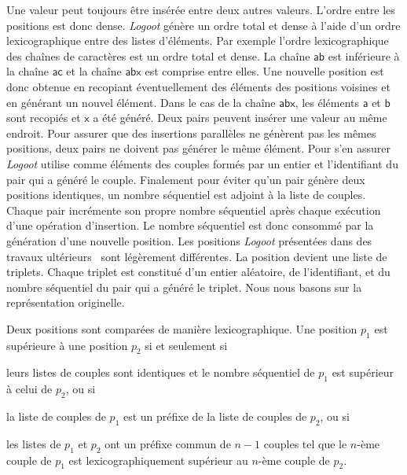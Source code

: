 Une valeur peut toujours être insérée entre deux autres valeurs.
L'ordre entre les positions est donc dense.
\emph{Logoot} génère un ordre total et dense à l'aide d'un ordre lexicographique entre des listes d'éléments.
Par exemple l'ordre lexicographique des chaînes de caractères est un ordre total et dense.
La chaîne $\textsf{ab}$ est inférieure à la chaîne $\textsf{ac}$ et la chaîne $\textsf{abx}$ est comprise entre elles.
Une nouvelle position est donc obtenue en recopiant éventuellement des éléments des positions voisines et en générant un nouvel élément.
Dans le cas de la chaîne $\textsf{abx}$, les éléments $\textsf{a}$ et $\textsf{b}$ sont recopiés et $\textsf{x}$ a été généré.
Deux pairs peuvent insérer une valeur au même endroit.
Pour assurer que des insertions parallèles ne génèrent pas les mêmes positions, deux pairs ne doivent pas générer le même élément.
Pour s'en assurer \emph{Logoot} utilise comme éléments des couples formés par un entier et l'identifiant du pair qui a généré le couple.
Finalement pour éviter qu'un pair génère deux positions identiques, un nombre séquentiel est adjoint à la liste de couples.
Chaque pair incrémente son propre nombre séquentiel après chaque exécution d'une opération d'insertion.
Le nombre séquentiel est donc consommé par la génération d'une nouvelle position.
Les positions \emph{Logoot} présentées dans des travaux ultérieurs~\autocite{weiss2010logoot} sont légèrement différentes.
La position devient une liste de triplets.
Chaque triplet est constitué d'un entier aléatoire, de l'identifiant, et du nombre séquentiel du pair qui a généré le triplet.
Nous nous basons sur la représentation originelle.

Deux positions sont comparées de manière lexicographique.
Une position $p_1$ est supérieure à une position $p_2$ si et seulement si \begin{inlinelist}\item leurs listes de couples sont identiques et le nombre séquentiel de $p_1$ est supérieur à celui de $p_2$, ou si \item la liste de couples de $p_1$ est un préfixe de la liste de couples de $p_2$, ou si \item les listes de $p_1$ et $p_2$ ont un préfixe commun de $n-1$ couples tel que le $n$-ème couple de $p_1$ est lexicographiquement supérieur au $n$-ème couple de $p_2$.\end{inlinelist}

